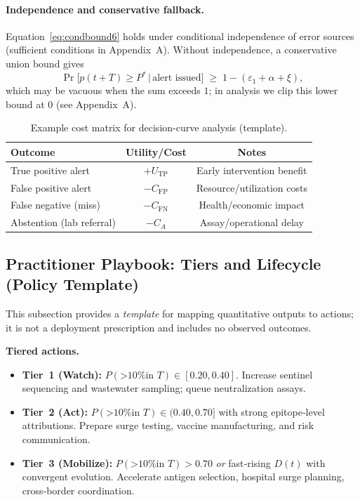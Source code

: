 \documentclass[11pt]{article}
\begin{document}
\paragraph{Independence and conservative fallback.}
Equation~\eqref{eq:condbound6} holds under conditional independence of error sources (sufficient conditions in Appendix~A). Without independence, a conservative union bound gives
\[
\Pr\!\big[p(t{+}T)\ge P^* \,\big|\, \text{alert issued}\big] \;\ge\; 1-(\varepsilon_1+\alpha+\xi),
\]
which may be vacuous when the sum exceeds $1$; in analysis we clip this lower bound at $0$ (see Appendix~A).

\begin{table}[H]
\centering
\caption{Example cost matrix for decision-curve analysis (template).}
\label{tab:cost}
\small
\begin{tabular}{lcc}
\toprule
Outcome & Utility/Cost & Notes \\
\midrule
True positive alert & $+U_{\text{TP}}$ & Early intervention benefit \\
False positive alert & $-C_{\text{FP}}$ & Resource/utilization costs \\
False negative (miss) & $-C_{\text{FN}}$ & Health/economic impact \\
Abstention (lab referral) & $-C_A$ & Assay/operational delay \\
\bottomrule
\end{tabular}
\end{table}

\subsection{Practitioner Playbook: Tiers and Lifecycle (Policy Template)}
\label{sec:playbook}
This subsection provides a \emph{template} for mapping quantitative outputs to actions; it is not a deployment prescription and includes no observed outcomes.

\textbf{Tiered actions.}
\begin{itemize}[leftmargin=*, itemsep=2pt, topsep=2pt]
  \item \textbf{Tier 1 (Watch):} $P(\text{>10\% in }T)\in[0.20,0.40]$. Increase sentinel sequencing and wastewater sampling; queue neutralization assays.
  \item \textbf{Tier 2 (Act):} $P(\text{>10\% in }T)\in(0.40,0.70]$ with strong epitope‑level attributions. Prepare surge testing, vaccine manufacturing, and risk communication.
  \item \textbf{Tier 3 (Mobilize):} $P(\text{>10\% in }T)>0.70$ \emph{or} fast‑rising $D(t)$ with convergent evolution. Accelerate antigen selection, hospital surge planning, cross‑border coordination.
\end{itemize}
\end{document}
